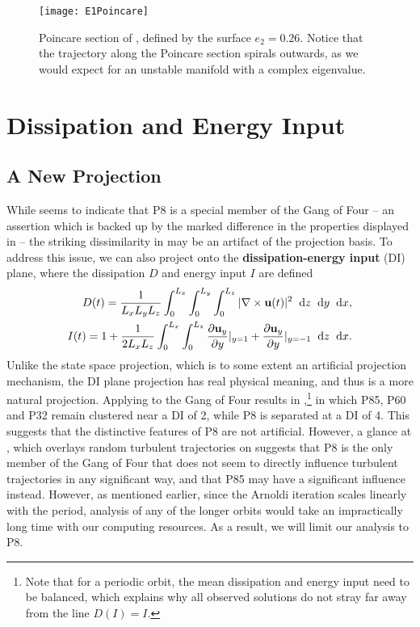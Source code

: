 \begin{figure}[h!]
\centerline{\texttt{[image: E1Poincare]}}
\caption{Poincare section of , defined by the surface $e_2 = 0.26$. Notice that the trajectory along the Poincare section spirals outwards, as we would expect for an unstable manifold with a complex eigenvalue.}\label{fig:E1Poincare}
\end{figure}

\section{Dissipation and Energy Input} \label{sec:DI}
  
\subsection{A New Projection}
While  seems to indicate that P8 is a special member of the Gang of Four -- an assertion which is backed up by the marked difference in the properties displayed in  -- the striking dissimilarity in  may be an artifact of the projection basis. To address this issue, we can also project onto the {\bf dissipation-energy input} (DI) plane, where the dissipation $D$ and energy input $I$ are defined
\begin{align}
D(t) = \frac{1}{L_xL_yL_z}\int{0}{L_x}{\int{0}{L_y}{\int{0}{L_z}{|\nabla\times\Vector{u}(t)|^2}{\textrm{d}z}}{\textrm{d}y}}{\textrm{d}x},\label{eq:diss}\\
I(t)  = 1 + \frac{1}{2L_xL_z}\int{0}{L_x}{\int{0}{L_z}{\pder{1}{\Vector{u}_{y}}{y} |_{y=1}+\pder{1}{\Vector{u}_{y}}{y} |_{y=-1}}{\textrm{d}z}}{\textrm{d}x}.\label{eq:einp}
\end{align} 
Unlike the state space projection, which is to some extent an artificial projection mechanism, the DI plane projection has real physical meaning, and thus is a more natural projection. Applying  to the Gang of Four results in ,\footnote{Note that for a periodic orbit, the mean dissipation and energy input need to be balanced, which explains why all observed solutions do not stray far away from the line $D(I) = I$.} in which P85, P60 and P32 remain clustered near a DI of 2, while P8 is separated at a DI of 4. This suggests that the distinctive features of P8 are not artificial. However, a glance at , which overlays random turbulent trajectories on  suggests that P8 is the only member of the Gang of Four that does not seem to directly influence turbulent trajectories in any significant way, and that P85 may have a significant influence instead. However, as mentioned earlier, since the Arnoldi iteration scales linearly with the period, analysis of any of the longer orbits would take an impractically long time with our computing resources. As a result, we will limit our analysis to P8.   
